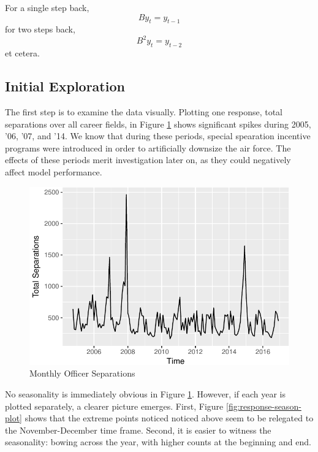 \documentclass[12pt,letterpaper,toc=flat,oneside]{report}
\theoremstyle{definition}
\theoremstyle{definition}
\theoremstyle{definition}
\theoremstyle{remark}
\begin{document}
For a single step back, \[ By_t = y_{t-1} \] for two steps back,
\[ B^2y_t = y_{t-2} \] et cetera.

\hypertarget{initial-exploration}{%
\subsection{Initial Exploration}\label{initial-exploration}}

The first step is to examine the data visually. Plotting one response,
total separations over all career fields, in Figure
\ref{fig:response-plot} shows significant spikes during 2005, '06, '07,
and '14. We know that during these periods, special spearation incentive
programs were introduced in order to artificially downsize the air
force. The effects of these periods merit investigation later on, as
they could negatively affect model performance.

\begin{figure}[H]

{\centering \includegraphics{elliott-econometric-personnel-retention-18_files/figure-latex/response-plot-1} 

}

\caption{Monthly Officer Separations}\label{fig:response-plot}
\end{figure}

No seasonality is immediately obvious in Figure \ref{fig:response-plot}.
However, if each year is plotted separately, a clearer picture emerges.
First, Figure \ref{fig:response-season-plot} shows that the extreme
points noticed noticed above seem to be relegated to the
November-December time frame. Second, it is easier to witness the
seasonality: bowing across the year, with higher counts at the beginning
and end.
\end{document}
